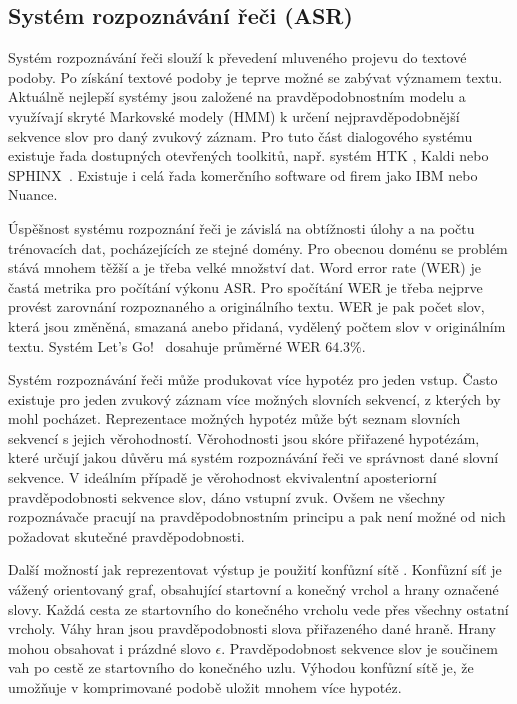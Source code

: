 \subsection{Systém rozpoznávání řeči (ASR)}

Systém rozpoznávání řeči slouží k převedení mluveného projevu do textové podoby.
Po získání textové podoby je teprve možné se zabývat významem textu.
Aktuálně nejlepší systémy jsou založené na pravděpodobnostním modelu a využívají skryté Markovské modely (HMM) k určení nejpravděpodobnější sekvence slov pro daný zvukový záznam.
Pro tuto část dialogového systému existuje řada dostupných otevřených toolkitů, např. systém HTK \cite{young2002htk}, Kaldi \cite{Povey_ASRU2011} nebo SPHINX~\cite{walker2004sphinx}.
Existuje i celá řada komerčního software od firem jako IBM nebo Nuance.

Úspěšnost systému rozpoznání řeči je závislá na obtížnosti úlohy a na počtu trénovacích dat, pocházejících ze stejné domény.
Pro obecnou doménu se problém stává mnohem těžší a je třeba velké množství dat.
Word error rate (WER) je častá metrika pro počítání výkonu ASR.
Pro spočítání WER je třeba nejprve provést zarovnání rozpoznaného a originálního textu. WER je pak počet slov, která jsou změněná, smazaná anebo přidaná, vydělený počtem slov v originálním textu.
Systém Let's Go!~\cite{raux2006doing} dosahuje průměrné WER $64.3\%$.

Systém rozpoznávání řeči může produkovat více hypotéz pro jeden vstup.
Často existuje pro jeden zvukový záznam více možných slovních sekvencí, z kterých by mohl pocházet.
Reprezentace možných hypotéz může být seznam slovních sekvencí s jejich věrohodností.
Věrohodnosti jsou skóre přiřazené hypotézám, které určují jakou důvěru má systém rozpoznávání řeči ve správnost dané slovní sekvence.
V ideálním případě je věrohodnost ekvivalentní aposteriorní pravděpodobnosti sekvence slov, dáno vstupní zvuk.
Ovšem ne všechny rozpoznávače pracují na pravděpodobnostním principu a pak není možné od nich požadovat skutečné pravděpodobnosti.

Další možností jak reprezentovat výstup je použití konfůzní sítě \cite{bertoldi2005new}.
Konfůzní síť je vážený orientovaný graf, obsahující startovní a konečný vrchol a hrany označené slovy.
Každá cesta ze startovního do konečného vrcholu vede přes všechny ostatní vrcholy.
Váhy hran jsou pravděpodobnosti slova přiřazeného dané hraně.
Hrany mohou obsahovat i prázdné slovo $\epsilon$.
Pravděpodobnost sekvence slov je součinem vah po cestě ze startovního do konečného uzlu.
Výhodou konfůzní sítě je, že umožňuje v komprimované podobě uložit mnohem více hypotéz.

